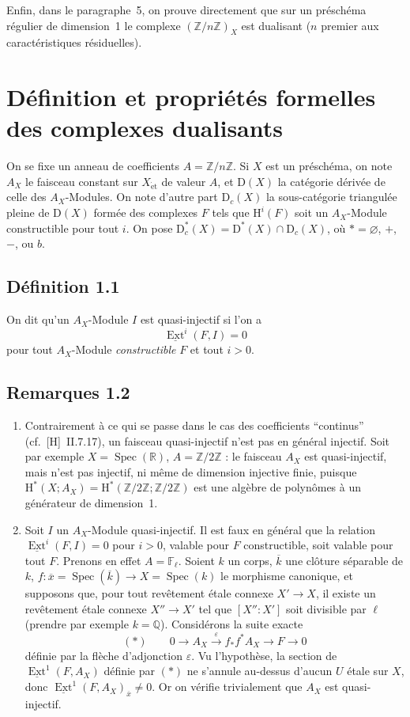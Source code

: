 \documentclass[11pt]{article}
\renewcommand{\H}{\mathrm{H}}
\DeclareMathOperator{\Ext}{Ext}
\DeclareMathOperator{\Spec}{Spec}
\newcommand{\D}{\mathrm{D}}
\newcommand{\Z}{\mathbb{Z}}
\newcommand{\F}{\mathbb{F}}
\newcommand{\Q}{\mathbb{Q}}
\newcommand{\ol}[1]{\overline{#1}}
\providecommand{\Z}{\mathbb Z}
\providecommand{\Spec}{\operatorname{Spec}}
\providecommand{\Spec}{\operatorname{Spec}}
\providecommand{\Spec}{\operatorname{Spec}}
\providecommand{\Spec}{\operatorname{Spec}}
\begin{document}
Enfin, dans le paragraphe~5, on prouve directement que sur un préschéma régulier de dimension~1 le complexe $(\Z/n\Z)_X$ est dualisant ($n$ premier aux caractéristiques résiduelles).

\section*{Définition et propriétés formelles des complexes dualisants}

On se fixe un anneau de coefficients $A = \Z/n\Z$. Si $X$ est un préschéma, on note $A_X$ le faisceau constant sur $X_{\mathrm{\acute{e}t}}$ de valeur $A$, et $\D(X)$ la catégorie dérivée de celle des $A_X$-Modules. On note d'autre part $\D_c(X)$ la sous-catégorie triangulée pleine de $\D(X)$ formée des complexes $F$ tels que $\H^i(F)$ soit un $A_X$-Module constructible pour tout $i$. On pose $\D_c^{*}(X) = \D^{*}(X) \cap \D_c(X)$, où $* = \varnothing$, $+$, $-$, ou $b$.

\subsection*{Définition 1.1}
On dit qu'un $A_X$-Module $I$ est quasi-injectif si l'on a
\[
\underline{\Ext}^i(F,I) = 0
\]
pour tout $A_X$-Module \emph{constructible} $F$ et tout $i > 0$.

\subsection*{Remarques 1.2}
\begin{enumerate}[label=\alph*)]
\item Contrairement à ce qui se passe dans le cas des coefficients ``continus'' (cf.~[H]~II.7.17), un faisceau quasi-injectif n'est pas en général injectif. Soit par exemple $X = \Spec(\mathbb{R})$, $A = \Z/2\Z$ : le faisceau $A_X$ est quasi-injectif, mais n'est pas injectif, ni même de dimension injective finie, puisque $\H^{*}(X; A_X) = \H^{*}(\Z/2\Z; \Z/2\Z)$ est une algèbre de polynômes à un générateur de dimension~1.

\item Soit $I$ un $A_X$-Module quasi-injectif. Il est faux en général que la relation $\underline{\Ext}^i(F,I) = 0$ pour $i > 0$, valable pour $F$ constructible, soit valable pour tout $F$. Prenons en effet $A = \F_{\ell}$. Soient $k$ un corps, $\ol{k}$ une clôture séparable de $k$, $f : \ol{x} = \Spec(\ol{k}) \to X = \Spec(k)$ le morphisme canonique, et supposons que, pour tout revêtement étale connexe $X' \to X$, il existe un revêtement étale connexe $X'' \to X'$ tel que $[X'':X']$ soit divisible par $\ell$ (prendre par exemple $k = \Q$). Considérons la suite exacte
\[
(*) \qquad 0 \longrightarrow A_X \xrightarrow{\;\varepsilon\;} f_{*}f^{*}A_X \longrightarrow F \longrightarrow 0
\]
définie par la
flèche d'adjonction $\varepsilon$. Vu l'hypothèse, la section de $\underline{\Ext}^1(F,A_X)$ définie par $(*)$ ne s'annule au-dessus d'aucun $U$ étale sur $X$, donc $\underline{\Ext}^1(F,A_X)_{\ol{x}} \neq 0$. Or on vérifie trivialement que $A_X$ est quasi-injectif.
\end{enumerate}
\end{document}
